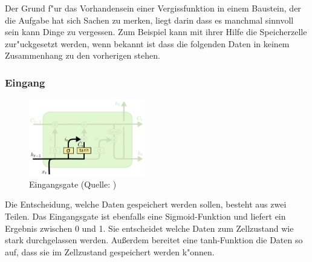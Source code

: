 {Der Grund f"ur das Vorhandensein einer Vergissfunktion in einem Baustein, der die Aufgabe hat sich Sachen zu merken, liegt darin dass es manchmal sinnvoll sein kann Dinge zu vergessen. Zum Beispiel kann mit ihrer Hilfe die Speicherzelle zur"uckgesetzt werden, wenn bekannt ist dass die folgenden Daten in keinem Zusammenhang zu den vorherigen stehen.

\subsubsection{Eingang}
\begin{figure}
  \vspace{-30pt}
  \begin{center}
    \includegraphics[width=0.45\textwidth]{pictures/LSTM3-focus-i_cut.png}
  \end{center}
  \vspace{-20pt}
  \caption[LSTM: Eingangsgate]{Eingangsgate (Quelle: \cite{OlahImg})}
\vspace{-10pt}
\end{figure}
Die Entscheidung, welche Daten gespeichert werden sollen, besteht aus zwei Teilen. Das Eingangsgate ist ebenfalls eine Sigmoid-Funktion und liefert ein Ergebnis zwischen 0 und 1. Sie entscheidet welche Daten zum Zellzustand wie stark durchgelassen werden. Au{\ss}erdem bereitet eine tanh-Funktion die Daten so auf, dass sie im Zellzustand gespeichert werden k"onnen.

}
